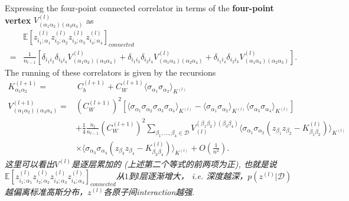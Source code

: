 Expressing the four-point connected correlator in terms of the \textbf{four-point vertex}
$V_{(\alpha_1\alpha_2)(\alpha_3\alpha_4)}^{(l)}$ as
\begin{equation}
    \begin{aligned}
    & \mathbb{E}\left[z_{i_1;\alpha_1}^{(l)}z_{i_2;\alpha_2}^{(l)}
        z_{i_3;\alpha_3}^{(l)}z_{i_4;\alpha_4}^{(l)} \right]_{connected} \\
    =& \frac{1}{n_{l-1}}\left[\delta_{i_1i_2}\delta_{i_3i_4}V_{(\alpha_1\alpha_2)
    (\alpha_3\alpha_4)}^{(l)} + \delta_{i_1i_3}\delta_{i_2i_4}V_{(\alpha_1\alpha_3)
    (\alpha_2\alpha_4)}^{(l)} + \delta_{i_1i_4}\delta_{i_2i_3}V_{(\alpha_1\alpha_4)
    (\alpha_2\alpha_3)}^{(l)} \right].
    \end{aligned}
    \label{eq:ch4_recur_4point_corr}
\end{equation}
The running of these correlators is given by the recursions
\begin{equation}
    \begin{aligned}
    K_{\alpha_1\alpha_2}^{(l+1)} =&~C_b^{(l+1)} + C_W^{(l+1)}\langle \sigma_{\alpha_1}
    \sigma_{\alpha_2}\rangle_{K^{(l)}} \\
    V_{(\alpha_1\alpha_2)(\alpha_3\alpha_4)}^{(l+1)}  
    =& \left(C_W^{(l+1)}\right)^2[\langle\sigma_{\alpha_1}\sigma_{\alpha_2}
    \sigma_{\alpha_3}\sigma_{\alpha_4}\rangle_{K^{(l)}} - 
    \langle\sigma_{\alpha_1}\sigma_{\alpha_2}\rangle_{K^{(l)}}
    \langle\sigma_{\alpha_3}\sigma_{\alpha_4}\rangle_{K^{(l)}}] \\
    & + \frac{1}{4}\frac{n_l}{n_{l-1}}\left(C_W^{(l+1)}\right)^2 \sum_{\beta_1,...,
    \beta_4\in \mathcal{D}} V_{(l)}^{(\beta_1\beta_2)(\beta_3\beta_4)}\langle
    \sigma_{\alpha_1}\sigma_{\alpha_2}(z_{\beta_1}z_{\beta_2} - 
    K_{\beta_1\beta_2}^{(l)})\rangle_{K^{(l)}} \\
    & \times \langle\sigma_{\alpha_3}\sigma_{\alpha_4}(z_{\beta_3}z_{\beta_4} - 
    K_{\beta_3\beta_4}^{(l)})\rangle_{K^{(l)}} + O\left(\frac{1}{n^2}\right).
    \end{aligned}
    \label{eq:ch4_recur_all_corr}
\end{equation}
\emph{这里可以看出$V^{(l)}$是逐层累加的 (上述第二个等式的前两项为正), 也就是说$\mathbb{E}\left[z_{i_1;\alpha_1}^{(l)}z_{i_2;\alpha_2}^{(l)}
z_{i_3;\alpha_3}^{(l)}z_{i_4;\alpha_4}^{(l)} \right]_{connected}$从$1$到$l$层逐渐增大，
i.e. 深度越深，$p(z^{(l)}|\mathcal{D})$ 越偏离标准高斯分布，$z^{(l)}$各原子间interaction越强}.

